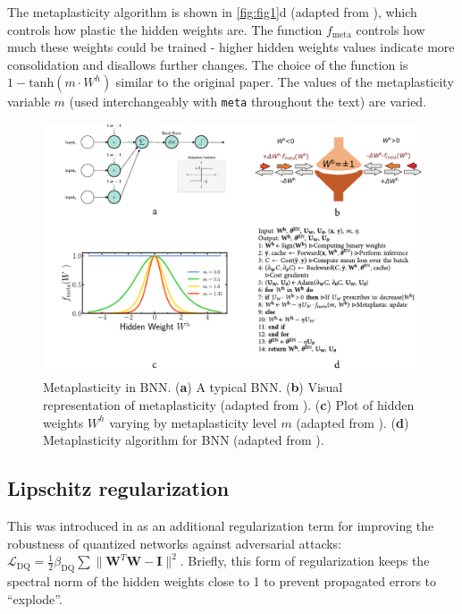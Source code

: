 \documentclass[manuscript,screen,review=false, nonacm]{acmart}
\begin{document}
The metaplasticity algorithm is shown in \autoref{fig:fig1}d (adapted from \cite{Laborieux_Ernoult_Hirtzlin_Querlioz_2021}), which controls how plastic the hidden weights are. The function $f_{\mathrm{meta}}$ controls how much these weights could be trained - higher hidden weights values indicate more consolidation and disallows further changes. The choice of the function is $1 - \mathrm{tanh}(m \cdot W^h)$ similar to the original paper. The values of the metaplasticity variable $m$ (used interchangeably with \texttt{meta} throughout the text) are varied.  

\begin{figure}[ht]
    \centering
    \includegraphics[width=\textwidth]{figures/report/Fig1.pdf}
    \caption{
    Metaplasticity in BNN.
    (\textbf{a}) A typical BNN. 
    (\textbf{b}) Visual representation of metaplasticity (adapted from \cite{Laborieux_Ernoult_Hirtzlin_Querlioz_2021}).
    (\textbf{c}) Plot of hidden weights $W^h$ varying by metaplasticity level $m$ (adapted from \cite{Laborieux_Ernoult_Hirtzlin_Querlioz_2021}).
    (\textbf{d}) Metaplasticity algorithm for BNN (adapted from \cite{Laborieux_Ernoult_Hirtzlin_Querlioz_2021}).
    }
    \label{fig:fig1}
\end{figure}

\subsection{Lipschitz regularization}

This was introduced in \cite{Lin_2019} as an additional regularization term for improving the robustness of quantized networks against adversarial attacks: $\mathcal{L}_{\mathrm{DQ}} = \frac{1}{2}\beta_{\mathrm{DQ}}\sum \lVert \mathbf{W}^T\mathbf{W} - \mathbf{I} \rVert^2$. Briefly, this form of regularization keeps the spectral norm of the hidden weights close to 1 to prevent propagated errors to ``explode''. 
\end{document}
